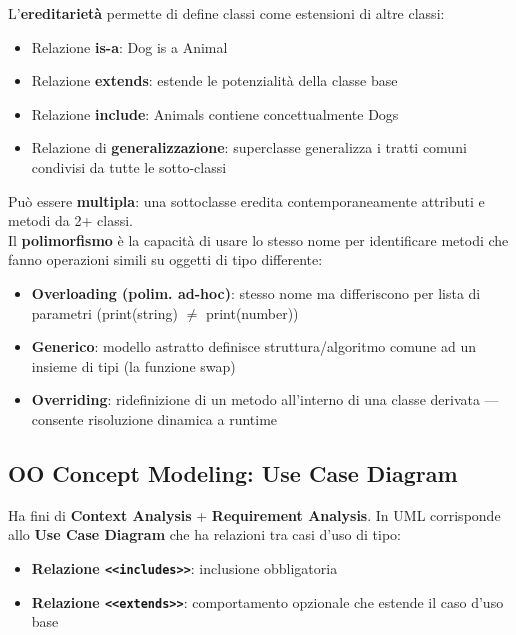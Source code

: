 \documentclass[12pt]{extarticle}
\begin{document}
\noindent L'\textbf{ereditarietà} permette di define classi come estensioni di altre classi:
\begin{itemize}
    \item Relazione \textbf{is-a}: Dog is a Animal
    \item Relazione \textbf{extends}: estende le potenzialità della classe base
    \item Relazione \textbf{include}: Animals contiene concettualmente Dogs
    \item Relazione di \textbf{generalizzazione}: superclasse generalizza i tratti comuni condivisi da tutte le sotto-classi
\end{itemize}
Può essere \textbf{multipla}: una sottoclasse eredita contemporaneamente attributi e metodi da 2+ classi.\\

\noindent Il \textbf{polimorfismo} è la capacità di usare lo stesso nome per identificare metodi che fanno operazioni simili su oggetti di tipo differente:
\begin{itemize}
    \item \textbf{Overloading (polim. ad-hoc)}: stesso nome ma differiscono per lista di parametri (print(string) $\neq$ print(number))
    \item \textbf{Generico}: modello astratto definisce struttura/algoritmo comune ad un insieme di tipi (la funzione swap)
    \item \textbf{Overriding}: ridefinizione di un metodo all'interno di una classe derivata --- consente risoluzione dinamica a runtime
\end{itemize}

\subsection{OO Concept Modeling: Use Case Diagram} Ha fini di \textbf{Context Analysis} + \textbf{Requirement Analysis}. In UML corrisponde allo \textbf{Use Case Diagram} che ha relazioni tra casi d'uso di tipo:
\begin{itemize}
    \item \textbf{Relazione \texttt{<<includes>>}}: inclusione obbligatoria
    \item \textbf{Relazione \texttt{<<extends>>}}: comportamento opzionale che estende il caso d'uso base
\end{itemize}
\end{document}
